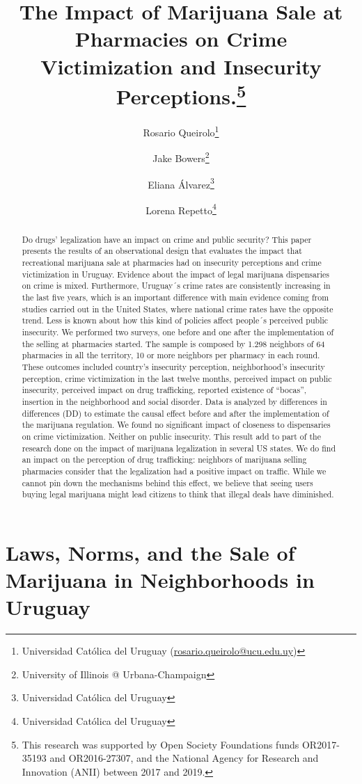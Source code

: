 \documentclass[11pt]{article}
\author{Rosario Queirolo\thanks{Universidad Católica del Uruguay (\url{rosario.queirolo@ucu.edu.uy})}
	\and Jake Bowers\thanks{University of Illinois @ Urbana-Champaign}
	\and Eliana Álvarez\thanks{Universidad Católica del Uruguay}
	\and Lorena Repetto\thanks{Universidad Católica del Uruguay}}
\title {The Impact of Marijuana Sale at Pharmacies on Crime Victimization and Insecurity Perceptions.\thanks{This research was supported by Open Society Foundations funds OR2017-35193 and OR2016-27307, and the National Agency for Research and Innovation (ANII) between 2017 and 2019.}}
\begin{document}

\maketitle

 
\begin{abstract}

Do drugs' legalization have an impact on crime and public security? This paper presents the results of an observational design that evaluates the impact that recreational marijuana sale at pharmacies had on insecurity perceptions and crime victimization in Uruguay. Evidence about the impact of legal marijuana dispensaries on crime is mixed. Furthermore, Uruguay´s crime rates are consistently increasing in the last five years, which is an important difference with main evidence coming from studies carried out in the United States, where national crime rates have the opposite trend. Less is known about how this kind of policies affect people´s perceived public insecurity. We performed two surveys, one before and one after the implementation of the selling at pharmacies started. The sample is composed by 1.298 neighbors of 64 pharmacies in all the territory, 10 or more neighbors per pharmacy in each round. These outcomes included country’s insecurity perception, neighborhood’s insecurity perception, crime victimization in the last twelve months, perceived impact on public insecurity, perceived impact on drug trafficking, reported existence of ``bocas'', insertion in the neighborhood and social disorder. Data is analyzed by differences in differences (DD) to estimate the causal effect before and after the implementation of the marijuana regulation. We found no significant impact of closeness to dispensaries on crime victimization. Neither on public insecurity. This result add to part of the research done on the impact of marijuana legalization in several US states. We do find an impact on the perception of drug trafficking: neighbors of marijuana selling pharmacies consider that the legalization had a positive impact on traffic. While we cannot pin down the mechanisms behind this effect, we believe that seeing users buying legal marijuana might lead citizens to think that illegal deals have diminished.
\end{abstract}

\section[]{Laws, Norms, and the Sale of Marijuana in Neighborhoods in Uruguay}
\end{document}
